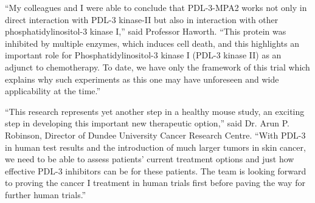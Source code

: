 \documentclass{article}
\begin{document}
“My colleagues and I were able to conclude that PDL-3-MPA2 works not only in direct interaction with PDL-3 kinase-II but also in interaction with other phosphatidylinositol-3 kinase I,” said Professor Haworth. “This protein was inhibited by multiple enzymes, which induces cell death, and this highlights an important role for Phosphatidylinositol-3 kinase I (PDL-3 kinase II) as an adjunct to chemotherapy. To date, we have only the framework of this trial which explains why such experiments as this one may have unforeseen and wide applicability at the time.”

“This research represents yet another step in a healthy mouse study, an exciting step in developing this important new therapeutic option,” said Dr. Arun P. Robinson, Director of Dundee University Cancer Research Centre. “With PDL-3 in human test results and the introduction of much larger tumors in skin cancer, we need to be able to assess patients’ current treatment options and just how effective PDL-3 inhibitors can be for these patients. The team is looking forward to proving the cancer I treatment in human trials first before paving the way for further human trials.”
\end{document}
